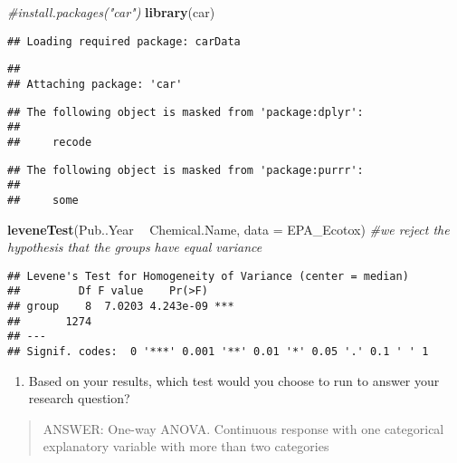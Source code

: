 \documentclass[]{article}
\newenvironment{Shaded}{\begin{snugshade}}{\end{snugshade}}
\newcommand{\KeywordTok}[1]{\textcolor[rgb]{0.13,0.29,0.53}{\textbf{#1}}}
\newcommand{\DataTypeTok}[1]{\textcolor[rgb]{0.13,0.29,0.53}{#1}}
\newcommand{\StringTok}[1]{\textcolor[rgb]{0.31,0.60,0.02}{#1}}
\newcommand{\CommentTok}[1]{\textcolor[rgb]{0.56,0.35,0.01}{\textit{#1}}}
\newcommand{\OperatorTok}[1]{\textcolor[rgb]{0.81,0.36,0.00}{\textbf{#1}}}
\newcommand{\NormalTok}[1]{#1}
\providecommand{\tightlist}{%
  \setlength{\itemsep}{0pt}\setlength{\parskip}{0pt}}
\begin{document}
\begin{Shaded}
\begin{Highlighting}[]
\CommentTok{#install.packages("car")}
\KeywordTok{library}\NormalTok{(car)}
\end{Highlighting}
\end{Shaded}

\begin{verbatim}
## Loading required package: carData
\end{verbatim}

\begin{verbatim}
## 
## Attaching package: 'car'
\end{verbatim}

\begin{verbatim}
## The following object is masked from 'package:dplyr':
## 
##     recode
\end{verbatim}

\begin{verbatim}
## The following object is masked from 'package:purrr':
## 
##     some
\end{verbatim}

\begin{Shaded}
\begin{Highlighting}[]
\KeywordTok{leveneTest}\NormalTok{(Pub..Year }\OperatorTok{~}\StringTok{ }\NormalTok{Chemical.Name, }\DataTypeTok{data =}\NormalTok{ EPA_Ecotox) }\CommentTok{#we reject the hypothesis that the groups have equal variance}
\end{Highlighting}
\end{Shaded}

\begin{verbatim}
## Levene's Test for Homogeneity of Variance (center = median)
##         Df F value    Pr(>F)    
## group    8  7.0203 4.243e-09 ***
##       1274                      
## ---
## Signif. codes:  0 '***' 0.001 '**' 0.01 '*' 0.05 '.' 0.1 ' ' 1
\end{verbatim}

\begin{enumerate}
\def\labelenumi{\arabic{enumi}.}
\setcounter{enumi}{5}
\tightlist
\item
  Based on your results, which test would you choose to run to answer
  your research question?
\end{enumerate}

\begin{quote}
ANSWER: One-way ANOVA. Continuous response with one categorical
explanatory variable with more than two categories
\end{quote}
\end{document}

